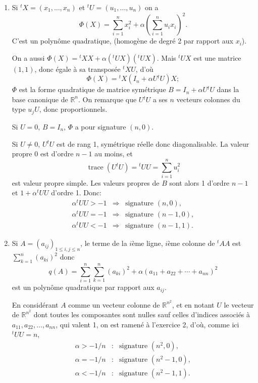 \begin{enumerate}[label=\arabic*.,leftmargin=2.2em,itemsep=1.1em]
Donc $F$ est non isotrope, on a $E=F\oplus F^0$. Le vecteur $v$ est non isotrope dans $F$, avec $G$ conjugué de $\mathbb Rv$ dans $F$, on a la somme directe
\[
E=\mathbb Rv\oplus G\oplus F^0,
\]
les 3 espaces étant 2 à 2 conjugués. En réunissant $\{v\}$ et des bases conjuguées de $G$ et $F^0$, on en obtient une de $E$. La signature de $B$ étant $(n-1,1)$, et $B(v,v)<0$, c'est que la restriction de $B$ à $G\times G$, (et aussi à $F^0\times F^0$) est définie positive. Finalement la signature de $B|_{F\times F}$ est $(\dim(F)-1,1)$.

\item Si ${}^tX=(x_1,\ldots,x_n)$ et ${}^tU=(u_1,\ldots,u_n)$ on a
\[
\Phi(X)=\sum_{i=1}^n x_i^2+\alpha\left(\sum_{i=1}^n u_ix_i\right)^2.
\]
C'est un polynôme quadratique, (homogène de degré 2 par rapport aux $x_i$).

On a aussi $\Phi(X)={}^tXX+\alpha({}^tUX)({}^tUX)$. Mais ${}^tUX$ est une matrice $(1,1)$, donc égale à sa transposée ${}^tXU$, d'où
\[
\Phi(X)={}^tX(I_n+\alpha U{}^tU)X;
\]
$\Phi$ est la forme quadratique de matrice symétrique $B=I_n+\alpha U{}^tU$ dans la base canonique de $\mathbb R^n$. On remarque que $U{}^tU$ a ses $n$ vecteurs colonnes du type $u_jU$, donc proportionnels.

Si $U=0$, $B=I_n$, $\Phi$ a pour signature $(n,0)$.

Si $U\ne0$, $U{}^tU$ est de rang 1, symétrique réelle donc diagonalisable. La valeur propre 0 est d'ordre $n-1$ au moins, et
\[
\operatorname{trace}(U{}^tU)={}^tUU=\sum_{i=1}^n u_i^2
\]
est valeur propre simple. Les valeurs propres de $B$ sont alors 1 d'ordre $n-1$ et $1+\alpha{}^tUU$ d'ordre 1. Donc:
\[
\begin{array}{rcl}
\alpha{}^tUU>-1&\Rightarrow&\text{signature }(n,0),\\
\alpha{}^tUU=-1&\Rightarrow&\text{signature }(n-1,0),\\
\alpha{}^tUU<-1&\Rightarrow&\text{signature }(n-1,1).
\end{array}
\]

\item Si $A=(a_{ij})_{1\le i,j\le n}$, le terme de la $i$ème ligne, $i$ème colonne de ${}^tAA$ est $\sum_{k=1}^n(a_{ki})^2$ donc
\[
q(A)=\sum_{i=1}^n\sum_{k=1}^n(a_{ki})^2+\alpha(a_{11}+a_{22}+\cdots+a_{nn})^2
\]
est un polynôme quadratique par rapport aux $a_{ij}$.

En considérant $A$ comme un vecteur colonne de $\mathbb R^{n^2}$, et en notant $U$ le vecteur de $\mathbb R^{n^2}$ dont toutes les composantes sont nulles sauf celles d'indices associés à $a_{11},a_{22},\ldots,a_{nn}$, qui valent 1, on est ramené à l'exercice 2, d'où, comme ici ${}^tUU=n$,
\[
\begin{array}{rcl}
\alpha>-1/n&:&\text{signature }(n^2,0),\\
\alpha=-1/n&:&\text{signature }(n^2-1,0),\\
\alpha<-1/n&:&\text{signature }(n^2-1,1).
\end{array}
\]


\end{enumerate}
